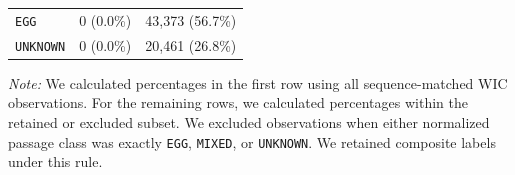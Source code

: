 \begin{table}[!h]
\begin{tabular*}{\textwidth}{@{\extracolsep{\fill}}lrr}
\texttt{EGG} & 0 (0.0\%) & 43,373 (56.7\%) \\
\texttt{UNKNOWN} & 0 (0.0\%) & 20,461 (26.8\%) \\
\bottomrule
\end{tabular*}
\par\vspace{0.35em}
\begin{minipage}{\textwidth}
\raggedright\footnotesize
\textit{Note:} We calculated percentages in the first row using all sequence-matched WIC observations. For the remaining rows, we calculated percentages within the retained or excluded subset. We excluded observations when either normalized passage class was exactly \texttt{EGG}, \texttt{MIXED}, or \texttt{UNKNOWN}. We retained composite labels under this rule.
\end{minipage}
\end{table}
